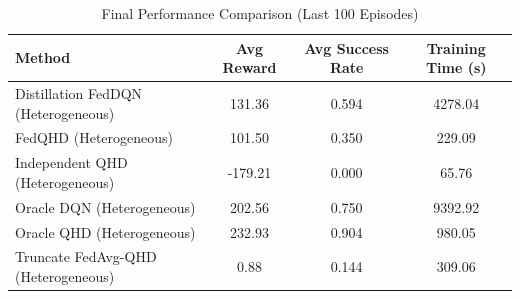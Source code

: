 \begin{table}[t]
\centering
\caption{Final Performance Comparison (Last 100 Episodes)}
\label{tab:performance_summary}
\begin{tabular}{lccc}
\toprule
Method & Avg Reward & Avg Success Rate & Training Time (s) \\
\midrule
Distillation FedDQN (Heterogeneous) & 131.36 & 0.594 & 4278.04 \\
FedQHD (Heterogeneous) & 101.50 & 0.350 & 229.09 \\
Independent QHD (Heterogeneous) & -179.21 & 0.000 & 65.76 \\
Oracle DQN (Heterogeneous) & 202.56 & 0.750 & 9392.92 \\
Oracle QHD (Heterogeneous) & 232.93 & 0.904 & 980.05 \\
Truncate FedAvg-QHD (Heterogeneous) & 0.88 & 0.144 & 309.06 \\
\bottomrule
\end{tabular}
\end{table}